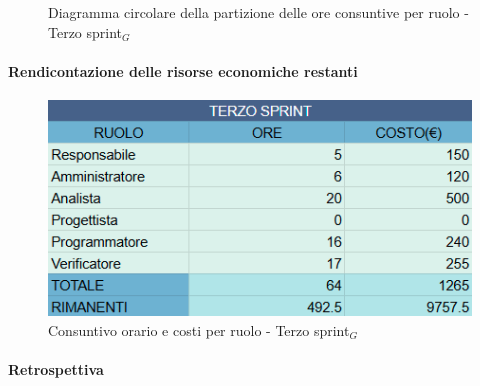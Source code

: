 \documentclass[10pt]{article}
\begin{document}
{{{{    \begin{figure}[H]
        \centering
        \caption{Diagramma circolare della partizione delle ore consuntive per ruolo - Terzo sprint$_G$ }
        \label{fig:Diagramma circolare della partizione delle ore consuntive per ruolo - terzo sprint$_G$}
    \end{figure}

    \paragraph{Rendicontazione delle risorse economiche restanti}\mbox{}\vspace{0.4em}
    \begin{figure}[H]
    	\centering
    	\includegraphics[width=0.6\linewidth]{oreCostiTerzoSprint.PNG}
    	\caption{Consuntivo orario e costi per ruolo - Terzo sprint$_G$}
    	\label{fig:Consuntivo orario e costi per ruolo - Terzo sprint$_G$}
    \end{figure}
    
    \paragraph{Retrospettiva}\mbox{}\vspace{0.4em}

}}}}
\end{document}
